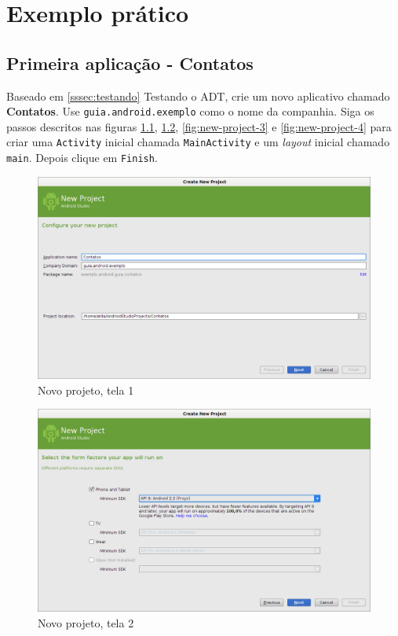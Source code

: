 \chapter{Exemplo prático}

\section{Primeira aplicação - Contatos}

Baseado em \ref{sssec:testando} Testando o ADT, crie um novo aplicativo
chamado \textbf{Contatos}. Use \texttt{guia.android.exemplo} como o nome
da companhia. Siga os passos descritos nas figuras
\ref{fig:new-project-1}, \ref{fig:new-project-2},
\ref{fig:new-project-3} e \ref{fig:new-project-4} para criar uma
\texttt{Activity} inicial chamada \texttt{MainActivity} e um
\emph{layout} inicial chamado \texttt{main}. Depois clique em
\texttt{Finish}.

\begin{figure}[h]
    \includegraphics[scale=0.35]{img/exemplo-pratico/android-new-project-1.png}
    \caption{Novo projeto, tela 1}
    \label{fig:new-project-1}
\end{figure}

\begin{figure}[p]
    \includegraphics[scale=0.35]{img/exemplo-pratico/android-new-project-2.png}
    \caption{Novo projeto, tela 2}
    \label{fig:new-project-2}
\end{figure}

